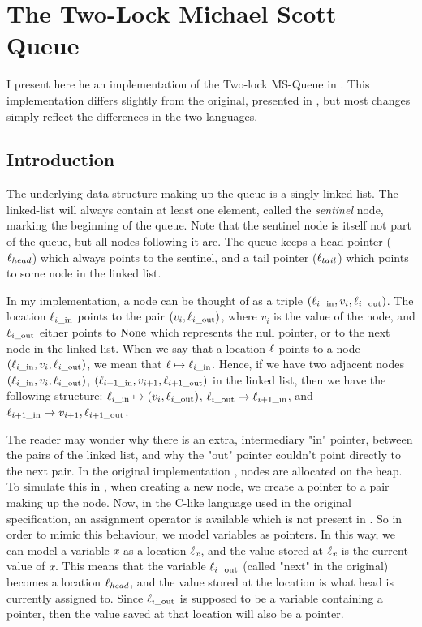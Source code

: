 \documentclass[a4paper, 11pt]{report}
\newcommand{\locin}[1]{\loc_{#1\_\text{in}}}
\newcommand{\locout}[1]{\loc_{#1\_\text{out}}}
\begin{document}
\chapter{The Two-Lock Michael Scott Queue}
\label{ch:TLMSQ}

I present here he an implementation of the Two-lock MS-Queue in \heaplang. This implementation differs slightly from the original, presented in \cite{DBLP:conf/podc/MichaelS96}, but most changes simply reflect the differences in the two languages.


\section{Introduction}
\label{TLMSQ:section:introduction}

The underlying data structure making up the queue is a singly-linked list. The linked-list will always contain at least one element, called the \emph{sentinel} node, marking the beginning of the queue. Note that the sentinel node is itself not part of the queue, but all nodes following it are. The queue keeps a head pointer ($\ell_{head}$) which always points to the sentinel, and a tail pointer ($\ell_{tail}$) which points to some node in the linked list.

In my implementation, a node can be thought of as a triple $(\locin{i}, v_i, \locout{i})$. The location $\locin{i}$ points to the pair $(v_i, \locout{i})$, where $v_i$ is the value of the node, and $\locout{i}$ either points to $\operatorname{None}$ which represents the null pointer, or to the next node in the linked list. When we say that a location $\ell$ points to a node $(\locin{i}, v_i, \locout{i})$, we mean that $\loc \mapsto \locin{i}$. Hence, if we have two adjacent nodes $(\locin{i}, v_i, \locout{i})$, $(\locin{i+1}, v_{i+1}, \locout{i+1})$ in the linked list, then we have the following structure: $\locin{i} \mapsto (v_i, \locout{i})$, $\locout{i} \mapsto \locin{i+1}$, and $\locin{i+1} \mapsto v_{i+1}, \locout{i+1}$.

The reader may wonder why there is an extra, intermediary "in" pointer, between the pairs of the linked list, and why the "out" pointer couldn't point directly to the next pair. In the original implementation \cite{DBLP:conf/podc/MichaelS96}, nodes are allocated on the heap. To simulate this in \heaplang, when creating a new node, we create a pointer to a pair making up the node. Now, in the C-like language used in the original specification, an assignment operator is available which is not present in \heaplang. So in order to mimic this behaviour, we model variables as pointers. In this way, we can model a variable $\textit{x}$ as a location $\ell_{\textit{x}}$, and the value stored at $\ell_{\textit{x}}$ is the current value of $\textit{x}$. This means that the variable $\locout{i}$ (called "next" in the original) becomes a location $\ell_{head}$, and the value stored at the location is what head is currently assigned to. Since $\locout{i}$ is supposed to be a variable containing a pointer, then the value saved at that location will also be a pointer.
\end{document}
